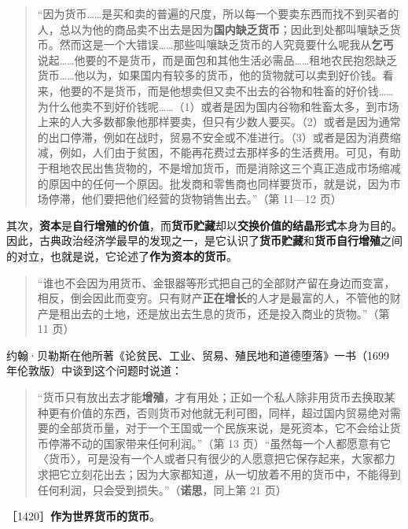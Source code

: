 \begin{quote}“因为货币……是买和卖的普遍的尺度，所以每一个要卖东西而找不到买者的人，总以为他的商品卖不出去是因为\textbf{国内缺乏货币}；因此到处都叫嚷缺乏货币。然而这是一个大错误……那些叫嚷缺乏货币的人究竟要什么呢我从\textbf{乞丐}说起……他要的不是货币，而是面包和其他生活必需品……租地农民抱怨缺乏货币……他以为，如果国内有较多的货币，他的货物就可以卖到好价钱。看来，他要的不是货币，而是他想卖但又卖不出去的谷物和牲畜的好价钱……为什么他卖不到好价钱呢……（1）或者是因为国内谷物和牲畜太多，到市场上来的人大多数都象他那样要卖，但只有少数人要买。（2）或者是因为通常的出口停滞，例如在战时，贸易不安全或不准进行。（3）或者是因为消费缩减，例如，人们由于贫困，不能再花费过去那样多的生活费用。可见，有助于租地农民出售货物的，不是增加货币，而是消除这三个真正造成市场缩减的原因中的任何一个原因。批发商和零售商也同样要货币，就是说，因为市场停滞，他们要把他们经营的货物销售出去。”（第 11—12 页）\end{quote}

其次，\textbf{资本}是\textbf{自行增殖的价值}，而\textbf{货币贮藏}却以\textbf{交换价值的结晶形式}本身为目的。因此，古典政治经济学最早的发现之一，是它认识了\textbf{货币贮藏}和\textbf{货币自行增殖}之间的对立，也就是说，它论述了\textbf{作为资本的货币}。

\begin{quote}“谁也不会因为用货币、金银器等形式把自己的全部财产留在身边而变富，相反，倒会因此而变穷。只有财产\textbf{正在增长}的人才是最富的人，不管他的财产是租出去的土地，还是放出去生息的货币，还是投入商业的货物。”（第 11 页）\end{quote}

\fontbox{~\{}约翰·贝勒斯在他所著《论贫民、工业、贸易、殖民地和道德堕落》一书（1699 年伦敦版）中谈到这个问题时说道：

\begin{quote}“货币只有放出去才能\textbf{增殖}，才有用处；正如一个私人除非用货币去换取某种更有价值的东西，否则货币对他就无利可图，同样，超过国内贸易绝对需要的全部货币量，对于一个王国或一个民族来说，是死资本，它不会给让货币停滞不动的国家带来任何利润。”（第 13 页）\fontbox{\}~}“虽然每一个人都愿意有它〈货币〉，可是没有一个人或者只有很少的人愿意把它保存起来，大家都力求把它立刻花出去；因为大家都知道，从一切放着不用的货币中，不能得到任何利润，只会受到损失。”（\textbf{诺思}，同上第 21 页）\end{quote}

［1420］\textbf{作为世界货币的货币}。

